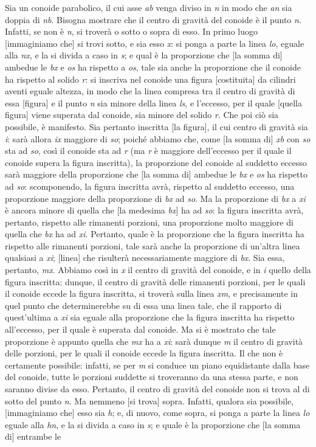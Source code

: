 \documentclass[11pt,twoside,openany]{book}
\begin{document}
Sia un conoide parabolico, il cui asse \emph{ab} venga diviso in \emph{n} in modo che \emph{an} sia doppia di \emph{nb}. Bisogna mostrare che il centro di gravità del conoide è il punto \emph{n}. Infatti, se non è \emph{n}, si troverà o sotto o sopra di esso. In primo luogo [immaginiamo che] si trovi sotto, e sia esso \emph{x}: si ponga a parte la linea \emph{lo}, eguale alla \emph{nx}, e la si divida a caso in \emph{s}; e qual è la proporzione che [la somma di] ambedue le \emph{bx} e \emph{os} ha rispetto a \emph{os}, tale sia anche la proporzione che il conoide ha rispetto al solido \emph{r}: si inscriva nel conoide una figura [costituita] da cilindri aventi eguale altezza, in modo che la linea compresa tra il centro di gravità di essa [figura] e il punto \emph{n} sia minore della linea \emph{ls}, e l'eccesso, per il quale [quella figura] viene superata dal conoide, sia minore del solido \emph{r}. Che poi ciò sia possibile, è manifesto. Sia pertanto inscritta [la figura], il cui centro di gravità sia \emph{i}: sarà allora \emph{ix} maggiore di \emph{so}; poiché abbiamo che, come [la somma di] \emph{xb} con \emph{so} sta ad \emph{so}, così il conoide sta ad \emph{r} (ma \emph{r} è maggiore dell'eccesso per il quale il conoide supera la figura inscritta), la proporzione del conoide al suddetto eccesso sarà maggiore della proporzione che [la somma di] ambedue le \emph{bx} e \emph{os} ha rispetto ad \emph{so}: scomponendo, la figura inscritta avrà, rispetto al suddetto eccesso, una proporzione maggiore della proporzione di \emph{bx} ad \emph{so}. Ma la proporzione di \emph{bx} a \emph{xi} è ancora minore di quella che [la medesima \emph{bx}] ha ad \emph{so}: la figura inscritta avrà, pertanto, rispetto alle rimanenti porzioni, una proporzione molto maggiore di quella che \emph{bx} ha ad \emph{xi}. Pertanto, quale è la proporzione che la figura inscritta ha rispetto alle rimanenti porzioni, tale sarà anche la proporzione di un'altra linea qualsiasi a \emph{xi}; [linea] che risulterà necessariamente maggiore di \emph{bx}. Sia essa, pertanto, \emph{mx}. Abbiamo così in \emph{x} il centro di gravità del conoide, e in \emph{i} quello della figura inscritta: dunque, il centro di gravità delle rimanenti porzioni, per le quali il conoide eccede la figura inscritta, si troverà sulla linea \emph{xm}, e precisamente in quel punto che determinerebbe su di essa una linea tale, che il rapporto di quest'ultima a \emph{xi} sia eguale alla proporzione che la figura inscritta ha rispetto all'eccesso, per il quale è superata dal conoide. Ma si è mostrato che tale proporzione è appunto quella che \emph{mx} ha a \emph{xi}: sarà dunque \emph{m} il centro di gravità delle porzioni, per le quali il conoide eccede la figura inscritta. Il che non è certamente possibile: infatti, se per \emph{m} si conduce un piano equidistante dalla base del conoide, tutte le porzioni suddette si troveranno da una stessa parte, e non saranno divise da esso. Pertanto, il centro di gravità del conoide non si trova al di sotto del punto \emph{n}. Ma nemmeno [si trova] sopra. Infatti, qualora sia possibile, [immaginiamo che] esso sia \emph{h}; e, di nuovo, come sopra, si ponga a parte la linea \emph{lo} eguale alla \emph{hn}, e la si divida a caso in \emph{s}; e quale è la proporzione che [la somma di] entrambe le 
\end{document}
